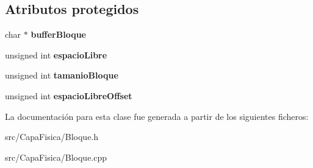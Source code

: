 \subsection*{\-Atributos protegidos}
\begin{DoxyCompactItemize}
\item 
\hypertarget{class_bloque_a40403cb2b046e3f26fb8ed57a10d57ae}{char $\ast$ {\bfseries buffer\-Bloque}}\label{class_bloque_a40403cb2b046e3f26fb8ed57a10d57ae}

\item 
\hypertarget{class_bloque_a01170e4564e9f25c1221024b6cd272ae}{unsigned int {\bfseries espacio\-Libre}}\label{class_bloque_a01170e4564e9f25c1221024b6cd272ae}

\item 
\hypertarget{class_bloque_a82685676dbec5b84e1790ec57a055fe9}{unsigned int {\bfseries tamanio\-Bloque}}\label{class_bloque_a82685676dbec5b84e1790ec57a055fe9}

\item 
\hypertarget{class_bloque_a80ab47800fcfa1e54d50e3e6f9522fdf}{unsigned int {\bfseries espacio\-Libre\-Offset}}\label{class_bloque_a80ab47800fcfa1e54d50e3e6f9522fdf}

\end{DoxyCompactItemize}


\-La documentación para esta clase fue generada a partir de los siguientes ficheros\-:\begin{DoxyCompactItemize}
\item 
src/\-Capa\-Fisica/\-Bloque.\-h\item 
src/\-Capa\-Fisica/\-Bloque.\-cpp\end{DoxyCompactItemize}
